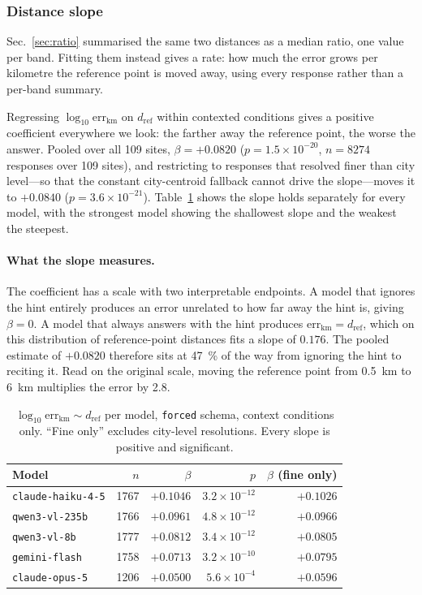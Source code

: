 \documentclass[10pt,a4paper]{article}
\newcommand{\errkm}{\ensuremath{\mathrm{err}_{\mathrm{km}}}}
\newcommand{\refkm}{\ensuremath{d_{\mathrm{ref}}}}
\begin{document}
\subsubsection{Distance slope}
\label{sec:slope}
\label{sec:distance}
Sec.~\ref{sec:ratio} summarised the same two distances as a median ratio, one
value per band. Fitting them instead gives a rate: how much the error grows per
kilometre the reference point is moved away, using every response rather than a
per-band summary.

Regressing $\log_{10}\errkm$ on \refkm{} within contexted conditions gives a
positive coefficient everywhere we look: the farther away the reference point,
the worse the answer. Pooled over all \num{109} sites,
$\beta = +\num{0.0820}$ ($p = 1.5\times10^{-20}$, $n=\num{8274}$ responses
over \num{109} sites), and restricting to responses that resolved finer than
city level---so that the constant city-centroid fallback cannot drive the
slope---moves it to $+\num{0.0840}$ ($p = 3.6\times10^{-21}$). Table~\ref{tab:dist} shows the slope holds separately for
every model, with the strongest model showing the shallowest slope and the
weakest the steepest.

\paragraph{What the slope measures.} The coefficient has a scale with two
interpretable endpoints. A model that ignores the hint entirely produces an
error unrelated to how far away the hint is, giving $\beta = 0$. A model that
always answers with the hint produces $\errkm = \refkm$, which on this
distribution of reference-point distances fits a slope of $\num{0.176}$. The
pooled estimate of $+\num{0.0820}$ therefore sits at \SI{47}{\percent} of the
way from ignoring the hint to reciting it. Read on the original scale, moving
the reference point from \SI{0.5}{\kilo\metre} to \SI{6}{\kilo\metre} multiplies
the error by \num{2.8}.

\begin{table}[!htbp]
\centering
\caption{$\log_{10}\errkm \sim \refkm$ per model, \texttt{forced} schema,
context conditions only. ``Fine only'' excludes city-level resolutions. Every
slope is positive and significant.}
\label{tab:dist}
\begin{tabular}{lrrrr}
\toprule
Model & $n$ & $\beta$ & $p$ & $\beta$ (fine only) \\
\midrule
\texttt{claude-haiku-4-5} & 1767 & $+0.1046$ & $3.2\times10^{-12}$ & $+0.1026$ \\
\texttt{qwen3-vl-235b}    & 1766 & $+0.0961$ & $4.8\times10^{-12}$ & $+0.0966$ \\
\texttt{qwen3-vl-8b}      & 1777 & $+0.0812$ & $3.4\times10^{-12}$ & $+0.0805$ \\
\texttt{gemini-flash}     & 1758 & $+0.0713$ & $3.2\times10^{-10}$ & $+0.0795$ \\
\texttt{claude-opus-5}    & 1206 & $+0.0500$ & $5.6\times10^{-4}$  & $+0.0596$ \\
\bottomrule
\end{tabular}
\end{table}
\end{document}
